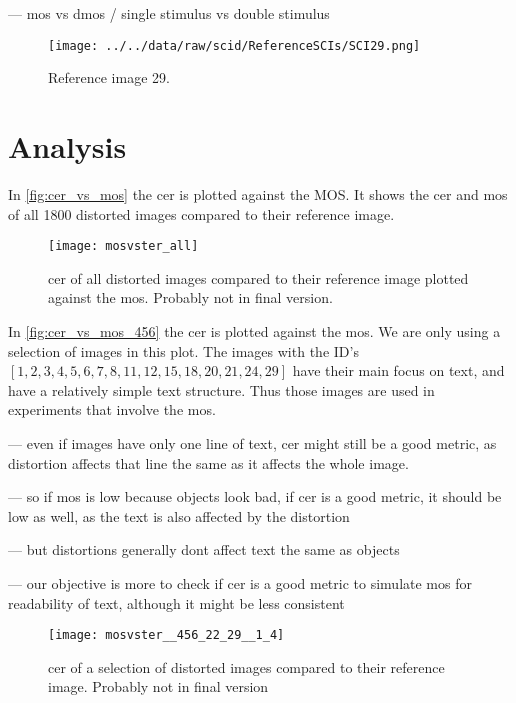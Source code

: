 --- mos vs dmos / single stimulus vs double stimulus

\begin{figure}
    \centering
    \texttt{[image: ../../data/raw/scid/ReferenceSCIs/SCI29.png]}
    \caption{Reference image 29.}
    \label{fig:ref29}
\end{figure}

\section{Analysis}
\label{sec:dataset_analysis}

In \autoref{fig:cer_vs_mos} the cer is plotted against the MOS.
It shows the \gls{cer} and \gls{mos} of all 1800 distorted images compared to their reference image.

\begin{figure}[h]
    \centering
    \texttt{[image: mosvster\_all]}
    \caption{\gls{cer} of all distorted images compared to their reference image plotted against the \gls{mos}. Probably not in final version.}
    \label{fig:cer_vs_mos}
\end{figure}

In \autoref{fig:cer_vs_mos_456} the \gls{cer} is plotted against the \gls{mos}.
We are only using a selection of images in this plot.
The images with the ID's $[1, 2, 3, 4, 5, 6, 7, 8, 11, 12, 15, 18, 20, 21, 24, 29]$ have their main focus on text, and have a relatively simple text structure.
Thus those images are used in experiments that involve the \gls{mos}.

--- even if images have only one line of text, cer might still be a good metric, as distortion affects that line the same as it affects the whole image.

--- so if mos is low because objects look bad, if cer is a good metric, it should be low as well, as the text is also affected by the distortion

--- but distortions generally dont affect text the same as objects

--- our objective is more to check if cer is a good metric to simulate mos for readability of text, although it might be less consistent


\begin{figure}[h]
    \centering
    \texttt{[image: mosvster\_\_456\_22\_29\_\_1\_4]}
    \caption{\gls{cer} of a selection of distorted images compared to their reference image. Probably not in final version}
    \label{fig:cer_vs_mos_456}
\end{figure}

